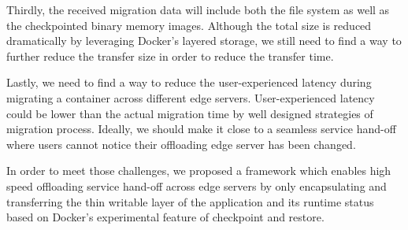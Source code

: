 Thirdly, the received migration data will include both the file system as well as the checkpointed binary memory images. Although the total size is reduced dramatically by leveraging Docker's layered storage, we still need to find a way to further reduce the transfer size in order to reduce the transfer time. 

Lastly, we need to find a way to reduce the user-experienced latency during migrating a container across different edge servers. User-experienced latency could be lower than the actual migration time by well designed strategies of migration process. Ideally, we should make it close to a seamless service hand-off where users cannot notice their offloading edge server has been changed.

In order to meet those challenges, we proposed a framework which enables high speed offloading service hand-off across edge servers by only encapsulating and transferring the thin writable layer of the application and its runtime status based on Docker's  experimental feature of checkpoint and restore.


